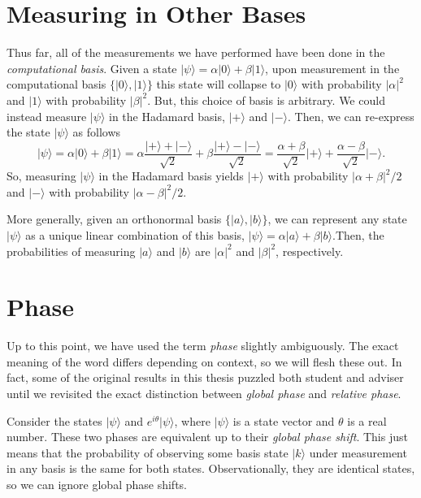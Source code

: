 \documentclass[12pt,twoside]{reedthesis}
\theoremstyle{definition}
\newcommand{\ketz}{\ensuremath{\lvert 0\rangle}\xspace}
\newcommand{\keto}{\ensuremath{\lvert 1\rangle}\xspace}
\newcommand{\ket}[1]{\ensuremath{\lvert #1\rangle}\xspace}
\newcommand{\Hplus}{\ensuremath{\lvert + \rangle}\xspace}
\newcommand{\Hminus}{\ensuremath{\lvert- \rangle}\xspace}
\begin{document}
\section{Measuring in Other Bases}
Thus far, all of the measurements we have performed have been done in the \textit{computational basis}. Given a state $\ket{\psi} = \alpha\ketz + \beta\keto$, upon measurement in the computational basis $\{\ketz, \keto\}$ this state will collapse to $\ketz$ with probability $\lvert \alpha \rvert^2$ and $\keto$ with probability  $\lvert \beta \rvert^2.$ But, this choice of basis is arbitrary. We could instead measure $\ket{\psi}$ in the Hadamard basis, $\Hplus$ and $\Hminus$. Then, we can re-express the state $\ket{\psi}$ as follows
\begin{equation*}
\ket{\psi} = \alpha\ketz + \beta\keto = \alpha \frac{\Hplus + \Hminus}{\sqrt{2}} + \beta \frac{\Hplus - \Hminus}{\sqrt{2}} = \frac{\alpha + \beta}{\sqrt{2}} \Hplus + \frac{\alpha - \beta}{\sqrt{2}} \Hminus.
\end{equation*}
So, measuring $\ket{\psi}$ in the Hadamard basis yields $\Hplus$ with probability $\lvert \alpha + \beta \rvert^2/2$ and $\Hminus$ with probability $\lvert\alpha - \beta\rvert^2/2$.

More generally, given an orthonormal basis $\{\ket{a}, \ket{b}\}$, we can represent any state $\ket{\psi}$ as a unique linear combination of this basis, $\ket{\psi} = \alpha \ket{a}+ \beta \ket{b}$.Then, the probabilities of measuring $\ket{a}$ and $\ket{b}$ are $\lvert \alpha\rvert^2$ and $\lvert\beta\rvert^2$, respectively.
 

\section{Phase}
Up to this point, we have used the term \textit{phase} slightly ambiguously. The exact meaning of the word differs depending on context, so we will flesh these out. In fact, some of the original results in this thesis puzzled both student and adviser until we revisited the exact distinction between \textit{global phase} and \textit{relative phase}.

Consider the states $\ket{\psi}$ and $e^{i \theta}\ket{\psi}$, where $\ket{\psi}$ is a state vector and $\theta$ is a real number. These two phases are equivalent up to their \textit{global phase shift}. This just means that the probability of observing some basis state $\ket{k}$ under measurement in any basis is the same for both states. Observationally, they are identical states, so we can ignore global phase shifts. 
\end{document}
